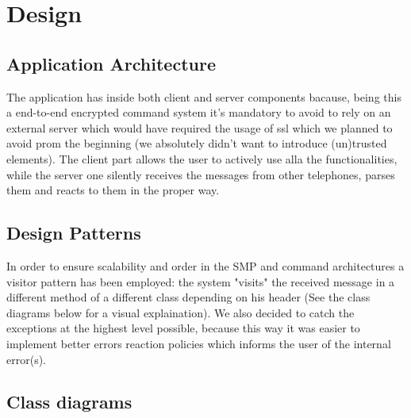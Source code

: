 \chapter{Design}

\section{Application Architecture}
The application has inside both client and server components bacause, being this a end-to-end encrypted command system it's mandatory to avoid to rely on an external server which would have required the usage of ssl which we planned to avoid prom the beginning (we absolutely didn't want to introduce (un)trusted elements). The client part allows the user to actively use alla the functionalities, while the server one silently receives the messages from other telephones, parses them and reacts to them in the proper way.

\section{Design Patterns}
In order to ensure scalability and order in the SMP and command architectures a visitor pattern has been employed: the system "visits" the received message in a different method of a different class depending on his header (See the class diagrams below for a visual explaination). We also decided to catch the exceptions at the highest level possible, because this way it was easier to implement better errors reaction policies which informs the user of the internal error(s).
\newpage
\section{Class diagrams}

